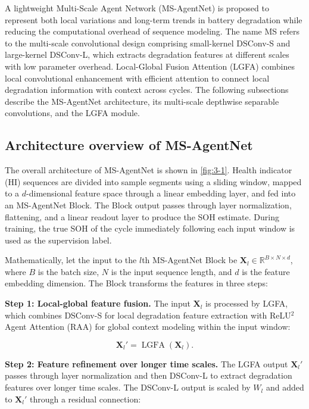 A lightweight Multi-Scale Agent Network (MS-AgentNet) is proposed to represent both local variations and long-term trends in battery degradation while reducing the computational overhead of sequence modeling. The name MS refers to the multi-scale convolutional design comprising small-kernel DSConv-S and large-kernel DSConv-L, which extracts degradation features at different scales with low parameter overhead. Local-Global Fusion Attention (LGFA) combines local convolutional enhancement with efficient attention to connect local degradation information with context across cycles. The following subsections describe the MS-AgentNet architecture, its multi-scale depthwise separable convolutions, and the LGFA module.

\subsection{Architecture overview of MS-AgentNet}

The overall architecture of MS-AgentNet is shown in \cref{fig:3-1}. Health indicator (HI) sequences are divided into sample segments using a sliding window, mapped to a $d$-dimensional feature space through a linear embedding layer, and fed into an MS-AgentNet Block. The Block output passes through layer normalization, flattening, and a linear readout layer to produce the SOH estimate. During training, the true SOH of the cycle immediately following each input window is used as the supervision label.

Mathematically, let the input to the $l$th MS-AgentNet Block be $\mathbf X_l\in\mathbb R^{B\times N\times d}$, where $B$ is the batch size, $N$ is the input sequence length, and $d$ is the feature embedding dimension. The Block transforms the features in three steps:

\textbf{Step 1: Local-global feature fusion.} The input $\mathbf X_l$ is processed by LGFA, which combines DSConv-S for local degradation feature extraction with ReLU$^2$ Agent Attention (RAA) for global context modeling within the input window:

\begin{equation}
\mathbf X_l'
=
\operatorname{LGFA}(\mathbf X_l).
\label{eq:block_lgfa}
\end{equation}

\textbf{Step 2: Feature refinement over longer time scales.} The LGFA output $\mathbf X_l'$ passes through layer normalization and then DSConv-L to extract degradation features over longer time scales. The DSConv-L output is scaled by $W_l$ and added to $\mathbf X_l'$ through a residual connection:

